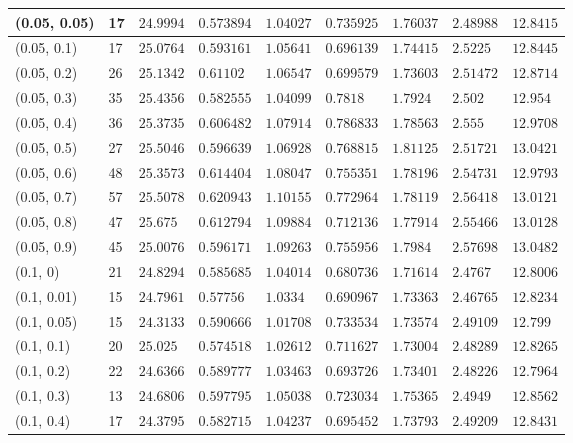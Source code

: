 \begin{center}
{\begin{longtable}{| l | p{} |  p{} | p{} | p{} | p{} | p{} | p{} | p{} |}
 (0.05, 0.05) & 17  & $24.9994$ & $0.573894$ & $1.04027$ & $0.735925$ & $1.76037$ & $2.48988$ & $12.8415$ \\ \hline
 (0.05, 0.1) & 17  & $25.0764$ & $0.593161$ & $1.05641$ & $0.696139$ & $1.74415$ & $2.5225$ & $12.8445$ \\ \hline
 (0.05, 0.2) & 26  & $25.1342$ & $0.61102$ & $1.06547$ & $0.699579$ & $1.73603$ & $2.51472$ & $12.8714$ \\ \hline
 (0.05, 0.3) & 35  & $25.4356$ & $0.582555$ & $1.04099$ & $0.7818$ & $1.7924$ & $2.502$ & $12.954$ \\ \hline
 (0.05, 0.4) & 36  & $25.3735$ & $0.606482$ & $1.07914$ & $0.786833$ & $1.78563$ & $2.555$ & $12.9708$ \\ \hline
 (0.05, 0.5) & 27  & $25.5046$ & $0.596639$ & $1.06928$ & $0.768815$ & $1.81125$ & $2.51721$ & $13.0421$ \\ \hline
 (0.05, 0.6) & 48  & $25.3573$ & $0.614404$ & $1.08047$ & $0.755351$ & $1.78196$ & $2.54731$ & $12.9793$ \\ \hline
 (0.05, 0.7) & 57  & $25.5078$ & $0.620943$ & $1.10155$ & $0.772964$ & $1.78119$ & $2.56418$ & $13.0121$ \\ \hline
 (0.05, 0.8) & 47  & $25.675$ & $0.612794$ & $1.09884$ & $0.712136$ & $1.77914$ & $2.55466$ & $13.0128$ \\ \hline
 (0.05, 0.9) & 45  & $25.0076$ & $0.596171$ & $1.09263$ & $0.755956$ & $1.7984$ & $2.57698$ & $13.0482$ \\ \hline
 (0.1, 0) & 21  & $24.8294$ & $0.585685$ & $1.04014$ & $0.680736$ & $1.71614$ & $2.4767$ & $12.8006$ \\ \hline
 (0.1, 0.01) & 15  & $24.7961$ & $0.57756$ & $1.0334$ & $0.690967$ & $1.73363$ & $2.46765$ & $12.8234$ \\ \hline
 (0.1, 0.05) & 15  & $24.3133$ & $0.590666$ & $1.01708$ & $0.733534$ & $1.73574$ & $2.49109$ & $12.799$ \\ \hline
 (0.1, 0.1) & 20  & $25.025$ & $0.574518$ & $1.02612$ & $0.711627$ & $1.73004$ & $2.48289$ & $12.8265$ \\ \hline
 (0.1, 0.2) & 22  & $24.6366$ & $0.589777$ & $1.03463$ & $0.693726$ & $1.73401$ & $2.48226$ & $12.7964$ \\ \hline
 (0.1, 0.3) & 13  & $24.6806$ & $0.597795$ & $1.05038$ & $0.723034$ & $1.75365$ & $2.4949$ & $12.8562$ \\ \hline
 (0.1, 0.4) & 17  & $24.3795$ & $0.582715$ & $1.04237$ & $0.695452$ & $1.73793$ & $2.49209$ & $12.8431$ \\ \hline

\end{longtable}}
\end{center}
